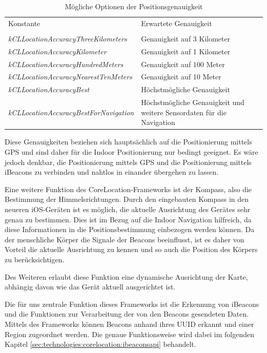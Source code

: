     \begin{table}[htb!]
      \centering
      \begin{tabular}{l p{6cm}}
        Konstante & Erwartete Genauigkeit \\ \\
		\emph{kCLLocationAccuracyThreeKilometers} & Genauigkeit auf 3 Kilometer \\
		\emph{kCLLocationAccuracyKilometer} & Genauigkeit auf 1 Kilometer \\
		\emph{kCLLocationAccuracyHundredMeters} & Genauigkeit auf 100 Meter \\
		\emph{kCLLocationAccuracyNearestTenMeters} & Genauigkeit auf 10 Meter \\
		\emph{kCLLocationAccuracyBest} & Höchstmögliche Genauigkeit \\
		\emph{kCLLocationAccuracyBestForNavigation} & Höchstmögliche Genauigkeit und weitere Sensordaten für die Navigation
      \end{tabular}
      \caption{Mögliche Optionen der Positionsgenauigkeit}
      \label{tbl:positionaccuracy}
    \end{table}
	
Diese Genauigkeiten beziehen sich hauptsächlich auf die Positionierung mittels GPS und sind daher für die Indoor Positionierung nur bedingt geeignet. Es wäre jedoch denkbar, die Positionierung mittels GPS und die Positionierung mittels iBeacons zu verbinden und nahtlos in einander übergehen zu lassen.

Eine weitere Funktion des CoreLocation-Frameworks ist der Kompass, also die Bestimmung der Himmelsrichtungen. Durch den eingebauten Kompass in den neueren iOS-Geräten ist es möglich, die aktuelle Ausrichtung des Gerätes sehr genau zu bestimmen. Dies ist im Bezug auf die Indoor Navigation hilfreich, da diese Informationen in die Positionsbestimmung einbezogen werden können. Da der menschliche Körper die Signale der Beacons beeinflusst, ist es daher von Vorteil die aktuelle Ausrichtung zu kennen und so auch die Position des Körpers zu berücksichtigen.

Des Weiteren erlaubt diese Funktion eine dynamische Ausrichtung der Karte, abhängig davon wie das Gerät aktuell ausgerichtet ist.

Die für uns zentrale Funktion dieses Frameworks ist die Erkennung von iBeacons und die Funktionen zur Verarbeitung der von den Beacons gesendeten Daten.
Mittels des Frameworks können Beacons anhand ihres UUID erkannt und einer Region zugeordnet werden. Die genaue Funktionsweise wird dabei im folgenden Kapitel \ref{sec:technologies:corelocation:ibeaconsapi} behandelt.

